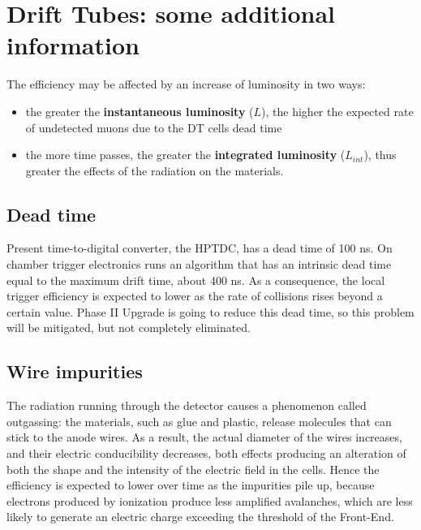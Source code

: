 \documentclass[12pt,twoside,a4paper]{report}
\numberwithin{equation}{section}
\begin{document}
\section{Drift Tubes: some additional information}
\label{sec:dt}

The efficiency may be affected by an increase of luminosity in two ways:
\begin{itemize}
\item the greater the \textbf{instantaneous luminosity} ($L$), the higher the expected rate of undetected muons due to the DT cells dead time
\item the more time passes, the greater the \textbf{integrated luminosity} ($L_{int}$), thus greater the effects of the radiation on the materials.
\end{itemize}

\subsection{Dead time}
Present time-to-digital converter, the HPTDC, has a dead time of 100 ns. On chamber trigger electronics runs an algorithm that has an intrinsic dead time equal to the maximum drift time, about 400 ns. As a consequence, the local trigger efficiency is expected to lower as the rate of collisions rises beyond a certain value. Phase II Upgrade is going to reduce this dead time, so this problem will be mitigated, but not completely eliminated.

\subsection{Wire impurities}
The radiation running through the detector causes a phenomenon called outgassing: the materials, such as glue and plastic, release molecules that can stick to the anode wires. As a result, the actual diameter of the wires increases, and their electric conducibility decreases, both effects producing an alteration of both the shape and the intensity of the electric field in the cells.
Hence the efficiency is expected to lower over time as the impurities pile up, because electrons produced by ionization produce less amplified avalanches, which are less likely to generate an electric charge exceeding the threshold of the Front-End.
\end{document}
